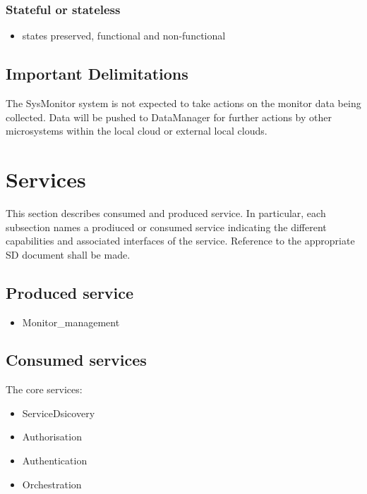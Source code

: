 \documentclass[a4paper]{arrowhead}
\begin{document}
\subsubsection {Stateful or stateless}
\begin{itemize} 
\item states preserved, functional and non-functional
\end{itemize}  


\subsection{Important Delimitations}
\label{sec:delimitations}

The SysMonitor system is not expected to take actions on the monitor data
being collected. Data will be pushed to DataManager for further
actions by other microsystems within the local cloud or external local clouds.



\section{Services}
\label{sec:services}

This section describes consumed and produced service.
In particular, each subsection names a prodiuced or consumed service
indicating the different capabilities and associated interfaces of the
service. Reference to the appropriate SD document shall be made.

\subsection{Produced service}

\begin{itemize}
\item Monitor\_management
\end{itemize}

\subsection{Consumed services}

The core services:
\begin{itemize}
\item ServiceDsicovery
\item Authorisation
\item Authentication
\item Orchestration
\end{itemize}
\end{document}
